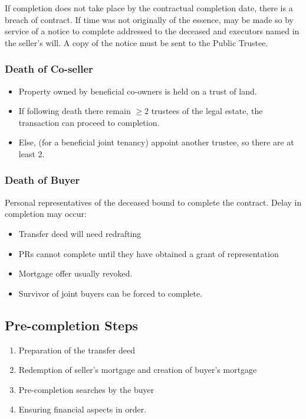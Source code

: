 \documentclass[
]{article}
\providecommand{\tightlist}{%
  \setlength{\itemsep}{0pt}\setlength{\parskip}{0pt}}
\begin{document}
If completion does not take place by the contractual completion date,
there is a breach of contract. If time was not originally of the
essence, may be made so by service of a notice to complete addressed to
the deceased and executors named in the seller's will. A copy of the
notice must be sent to the Public Trustee.

\hypertarget{death-of-co-seller}{%
\subsubsection{Death of Co-seller}\label{death-of-co-seller}}

\begin{itemize}
\tightlist
\item
  Property owned by beneficial co-owners is held on a trust of land.
\item
  If following death there remain \(\geq 2\) trustees of the legal
  estate, the transaction can proceed to completion.
\item
  Else, (for a beneficial joint tenancy) appoint another trustee, so
  there are at least 2.
\end{itemize}

\hypertarget{death-of-buyer}{%
\subsubsection{Death of Buyer}\label{death-of-buyer}}

Personal representatives of the deceased bound to complete the contract.
Delay in completion may occur:

\begin{itemize}
\tightlist
\item
  Transfer deed will need redrafting
\item
  PRs cannot complete until they have obtained a grant of representation
\item
  Mortgage offer usually revoked.
\item
  Survivor of joint buyers can be forced to complete.
\end{itemize}

\hypertarget{pre-completion-steps}{%
\subsection{Pre-completion Steps}\label{pre-completion-steps}}

\begin{enumerate}
\def\labelenumi{\arabic{enumi}.}
\tightlist
\item
  Preparation of the transfer deed
\item
  Redemption of seller's mortgage and creation of buyer's mortgage
\item
  Pre-completion searches by the buyer
\item
  Ensuring financial aspects in order.
\end{enumerate}
\end{document}
